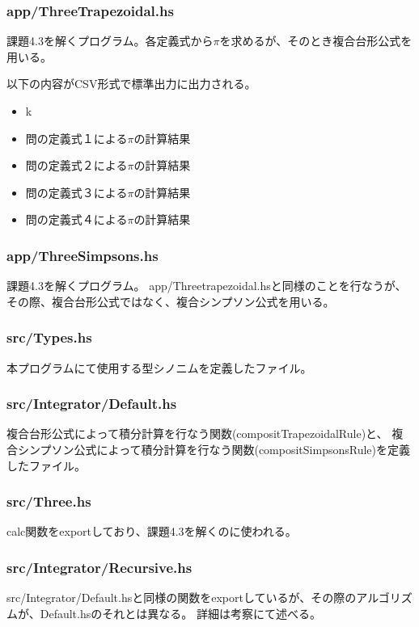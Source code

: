 \documentclass[11pt]{jsarticle}
\begin{document}
\subsubsection*{app/ThreeTrapezoidal.hs}
課題4.3を解くプログラム。各定義式から$\pi$を求めるが、そのとき複合台形公式を用いる。

以下の内容がCSV形式で標準出力に出力される。
\begin{itemize}
    \item k
    \item 問の定義式１による$\pi$の計算結果
    \item 問の定義式２による$\pi$の計算結果
    \item 問の定義式３による$\pi$の計算結果
    \item 問の定義式４による$\pi$の計算結果
\end{itemize}

\subsubsection*{app/ThreeSimpsons.hs}
課題4.3を解くプログラム。
app/Threetrapezoidal.hsと同様のことを行なうが、その際、複合台形公式ではなく、複合シンプソン公式を用いる。

\subsubsection*{src/Types.hs}
本プログラムにて使用する型シノニムを定義したファイル。

\subsubsection*{src/Integrator/Default.hs}
複合台形公式によって積分計算を行なう関数(compositTrapezoidalRule)と、
複合シンプソン公式によって積分計算を行なう関数(compositSimpsonsRule)を定義したファイル。

\subsubsection*{src/Three.hs}
calc関数をexportしており、課題4.3を解くのに使われる。

\subsubsection*{src/Integrator/Recursive.hs}
src/Integrator/Default.hsと同様の関数をexportしているが、その際のアルゴリズムが、Default.hsのそれとは異なる。
詳細は考察にて述べる。
\end{document}
